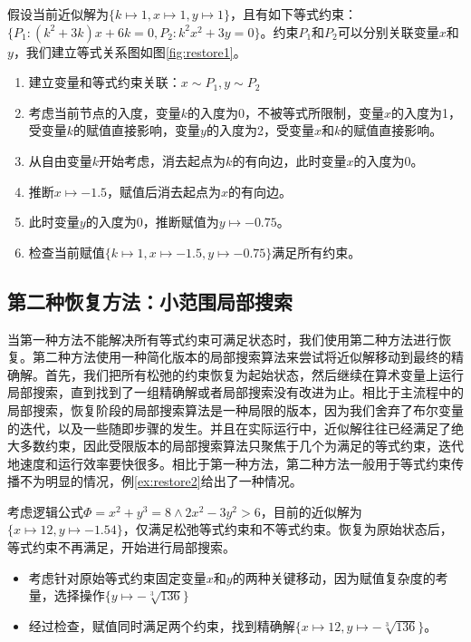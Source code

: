 \begin{example}
\label{ex:restore1}
假设当前近似解为$\{k \mapsto 1, x \mapsto 1, y \mapsto 1\}$，且有如下等式约束：$\{P_1: (k^2 + 3k) x + 6k = 0, P_2: k^2 x^2 + 3y = 0\}$。约束$P_1$和$P_2$可以分别关联变量$x$和$y$，我们建立等式关系图如图\ref{fig:restore1}。
\begin{enumerate}
    \item 建立变量和等式约束关联：$x \sim P_1, y \sim P_2$
    \item 考虑当前节点的入度，变量$k$的入度为0，不被等式所限制，变量$x$的入度为1，受变量$k$的赋值直接影响，变量$y$的入度为2，受变量$x$和$k$的赋值直接影响。
    \item 从自由变量$k$开始考虑，消去起点为$k$的有向边，此时变量$x$的入度为0。
    \item 推断$x \mapsto -1.5$，赋值后消去起点为$x$的有向边。
    \item 此时变量$y$的入度为0，推断赋值为$y \mapsto -0.75$。
    \item 检查当前赋值$\{k \mapsto 1, x \mapsto -1.5, y \mapsto -0.75\}$满足所有约束。
\end{enumerate}
\end{example}


\subsection{第二种恢复方法：小范围局部搜索}
当第一种方法不能解决所有等式约束可满足状态时，我们使用第二种方法进行恢复。第二种方法使用一种简化版本的局部搜索算法来尝试将近似解移动到最终的精确解。首先，我们把所有松弛的约束恢复为起始状态，然后继续在算术变量上运行局部搜索，直到找到了一组精确解或者局部搜索没有改进为止。相比于主流程中的局部搜索，恢复阶段的局部搜索算法是一种局限的版本，因为我们舍弃了布尔变量的迭代，以及一些随即步骤的发生。并且在实际运行中，近似解往往已经满足了绝大多数约束，因此受限版本的局部搜索算法只聚焦于几个为满足的等式约束，迭代地速度和运行效率要快很多。相比于第一种方法，第二种方法一般用于等式约束传播不为明显的情况，例\ref{ex:restore2}给出了一种情况。

\begin{example}
考虑逻辑公式$\Phi = x^2 + y^3 = 8 \wedge 2x^2 - 3y^2 > 6$，目前的近似解为$\{x \mapsto 12, y \mapsto -1.54\}$，仅满足松弛等式约束和不等式约束。恢复为原始状态后，等式约束不再满足，开始进行局部搜索。
\begin{itemize}
    \item 考虑针对原始等式约束固定变量$x$和$y$的两种关键移动，因为赋值复杂度的考量，选择操作$\{y \mapsto -\sqrt[3]{136}\}$
    \item 经过检查，赋值同时满足两个约束，找到精确解$\{x \mapsto 12, y \mapsto -\sqrt[3]{136}\}$。
\end{itemize}
\label{ex:restore2}
\end{example}

